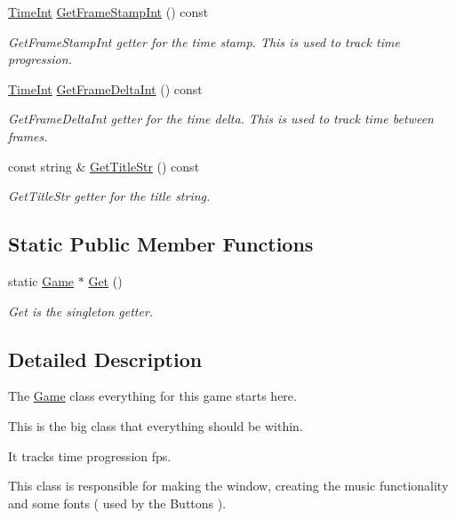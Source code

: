 \begin{DoxyCompactItemize}
\hyperlink{_game_8hpp_a332b72dfb4bc8b4c16b8dc43864fe343}{Time\-Int} \hyperlink{class_game_aa7cf915c5e5f3a4b57b28eba915cfe2c}{Get\-Frame\-Stamp\-Int} () const 
\begin{DoxyCompactList}\small\item\em Get\-Frame\-Stamp\-Int getter for the time stamp. This is used to track time progression. \end{DoxyCompactList}\item 
\hyperlink{_game_8hpp_a332b72dfb4bc8b4c16b8dc43864fe343}{Time\-Int} \hyperlink{class_game_a60b3e0977db00a1c6c6ead044c7b1f27}{Get\-Frame\-Delta\-Int} () const 
\begin{DoxyCompactList}\small\item\em Get\-Frame\-Delta\-Int getter for the time delta. This is used to track time between frames. \end{DoxyCompactList}\item 
const string \& \hyperlink{class_game_ad4eddde638de70fbbcdc212375fd7342}{Get\-Title\-Str} () const 
\begin{DoxyCompactList}\small\item\em Get\-Title\-Str getter for the title string. \end{DoxyCompactList}\end{DoxyCompactItemize}
\subsection*{Static Public Member Functions}
\begin{DoxyCompactItemize}
\item 
static \hyperlink{class_game}{Game} $\ast$ \hyperlink{class_game_a700c0cde9d2a8c5ad2672a8fdc0cfb4a}{Get} ()
\begin{DoxyCompactList}\small\item\em Get is the singleton getter. \end{DoxyCompactList}\end{DoxyCompactItemize}


\subsection{Detailed Description}
The \hyperlink{class_game}{Game} class everything for this game starts here. 

This is the big class that everything should be within.

It tracks time progression fps.

This class is responsible for making the window, creating the music functionality and some fonts ( used by the Buttons ).

